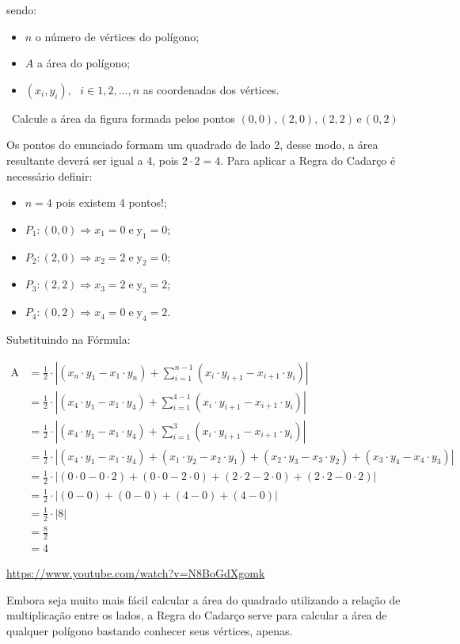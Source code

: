 sendo:
\begin{itemize}
	\item $n$ o número de vértices do polígono;
	\item $A$ a área do polígono;
	\item $(x_i,y_i),\,\,\,\,i \in {1,2,\ldots,n}$ as coordenadas dos vértices.
\end{itemize}
\begin{example}
	\video \, Calcule a área da figura formada pelos pontos $(0,0),(2,0),(2,2)\,\mathrm{e}\,(0,2)$

	Os pontos do enunciado formam um quadrado de lado 2, desse modo, a 	área resultante deverá ser igual a 4, pois $2 \cdot 2 = 4$. Para aplicar a Regra do Cadarço é necessário definir:

\begin{itemize}
	\item $n=4$ pois existem 4 pontos!;
	\item $P_{1}:(0,0)\Rightarrow x_{1}=0\;\mathrm{e\;y_{1}=0}$;
	\item $P_{2}:(2,0)\Rightarrow x_{2}=2\;\mathrm{e\;y_{2}=0}$;
	\item $P_{3}:(2,2)\Rightarrow x_{3}=2\;\mathrm{e\;y_{3}=2}$;
	\item $P_{4}:(0,2)\Rightarrow x_{4}=0\;\mathrm{e\;y_{4}=2}$.
\end{itemize}

Substituindo na Fórmula:

\begin{ceqn}
	\begin{align*}
	\mathrm{A} & = \frac{1}{2}\cdot|(x_{n}\cdot y_{1}-x_{1}\cdot y_{n})+\sum_{i=1}^{n-1}(x_{i}\cdot y_{i+1}-x_{i+1}\cdot y_{i})|\\
	& = \frac{1}{2}\cdot|(x_{4}\cdot y_{1}-x_{1}\cdot y_{4})+\sum_{i=1}^{4-1}(x_{i}\cdot y_{i+1}-x_{i+1}\cdot y_{i})|\\
	& = \frac{1}{2}\cdot|(x_{4}\cdot y_{1}-x_{1}\cdot y_{4})+\sum_{i=1}^{3}(x_{i}\cdot y_{i+1}-x_{i+1}\cdot y_{i})|\\
	& = \frac{1}{2}\cdot|(x_{4}\cdot y_{1}-x_{1}\cdot y_{4})+(x_{1}\cdot y_{2}-x_{2}\cdot y_{1})+(x_{2}\cdot y_{3}-x_{3}\cdot y_{2})+(x_{3}\cdot y_{4}-x_{4}\cdot y_{3})|\\
	& =  \frac{1}{2}\cdot|(0\cdot0-0\cdot2)+(0\cdot0-2\cdot0)+(2\cdot2-2\cdot0)+(2\cdot2-0\cdot2)|\\
	& = \frac{1}{2}\cdot|(0-0)+(0-0)+(4-0)+(4-0)|\\
	& = \frac{1}{2}\cdot|8|\\
	& = \frac{8}{2}\\
	& = 4
	\end{align*}
\end{ceqn}

\doutor \url{https://www.youtube.com/watch?v=N8BoGdXgomk}
\end{example}

Embora seja muito mais fácil calcular a área do quadrado utilizando a relação de multiplicação entre os lados, a Regra do Cadarço serve
para calcular a área de qualquer polígono bastando conhecer seus vértices, apenas.
